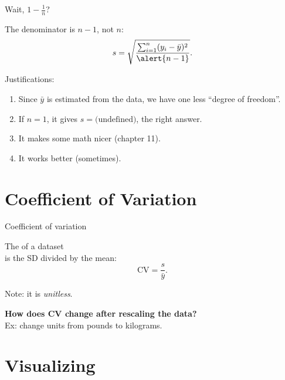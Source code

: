 \begin{frame}{Wait, $1-\frac{1}{n}$?}

The denominator is $n-1$, not $n$:
    \[
        s = \sqrt{\frac{\sum_{i=1}^n (y_i - \bar y)^2 }{ \alert{n-1} } } .
    \]

    \vspace{3em}

    Justifications:
    \begin{enumerate}
        \item Since $\bar y$ is estimated from the data, we have one less ``degree of freedom''.
        \item If $n=1$, it gives $s=\text{(undefined)}$, the right answer.
        \item It makes some math nicer (chapter 11).
        \item It works better (sometimes).
    \end{enumerate}

\end{frame}



\section{Coefficient of Variation}



\begin{frame}{Coefficient of variation}

    The  of a dataset\\
    is the SD divided by the mean:
    \[
        \text{CV} = \frac{ s }{ \bar y } .
    \]
    \vspace{1em}

    Note: it is \emph{unitless}.

    \vspace{3em}

    \pause
    \textbf{How does CV change after rescaling the data?} \\
    Ex: change units from pounds to kilograms.

\end{frame}


\section{Visualizing}

